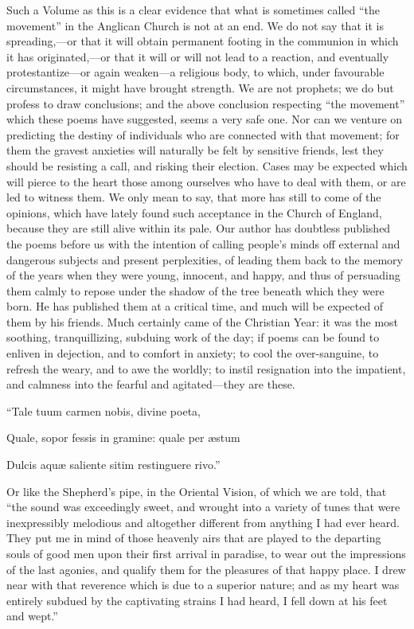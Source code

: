Such a Volume as this is a clear evidence that
what is sometimes called ``the movement'' in the Anglican Church is not
at an end. We do not say that it is spreading,—or that it will
obtain permanent footing in the communion in which it has
originated,—or that it will or will not lead to a reaction, and
eventually protestantize—or again weaken—a religious body, to
which, under favourable circumstances, it might have brought strength.
We are not prophets; we do but profess to draw conclusions; and the
above conclusion respecting ``the movement'' which these poems
have suggested, seems a very safe one. Nor can we venture on
predicting the destiny of individuals who are connected with that
movement; for them the gravest anxieties will naturally be felt by
sensitive friends, lest they should be resisting a call, and risking
their election. Cases may be expected which will pierce to the heart
those among ourselves who have to deal with them, or are led to
witness them. We only mean to say, that more has still to come of the
opinions, which have lately found such acceptance in the Church of
England, because they are still alive within its pale. Our author has
doubtless published the poems before us with the intention of calling
people's minds off external and dangerous subjects and present
perplexities, of leading them back to the memory of the years when
they were young, innocent, and happy, and thus of persuading them
calmly to repose under the shadow of the tree beneath which they were
born. He has published them at a critical time, and much will be
expected of them by his friends. Much certainly came of the Christian
Year: it was the most soothing, tranquillizing, subduing work of the
day; if poems can be found to enliven in dejection, and to comfort in
anxiety; to cool the over-sanguine, to refresh the weary, and to awe
the worldly; to instil resignation into the impatient, and calmness
into the fearful and agitated—they are these.

``Tale
tuum carmen nobis, divine poeta,

Quale, sopor fessis in gramine: quale per æstum

Dulcis aquæ saliente sitim restinguere rivo.''

Or like the Shepherd's pipe, in the Oriental
Vision, of which we are told, that ``the sound was exceedingly sweet,
and wrought into a variety of tunes that were inexpressibly melodious
and altogether different from anything I had ever heard. They
put me in mind of those heavenly airs that are played to the departing
souls of good men upon their first arrival in paradise, to wear out
the impressions of the last agonies, and qualify them for the
pleasures of that happy place. I drew near with that reverence which
is due to a superior nature; and as my heart was entirely subdued by
the captivating strains I had heard, I fell down at his feet and wept.''

